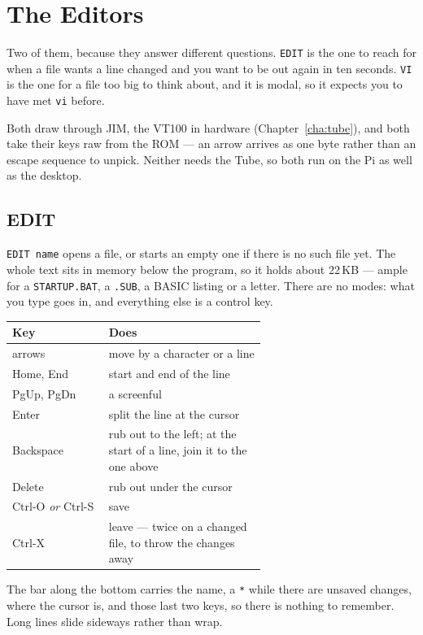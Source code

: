 \chapter{The Editors}\label{cha:editors}

Two of them, because they answer different questions. \verb|EDIT| is the
one to reach for when a file wants a line changed and you want to be out
again in ten seconds. \verb|VI| is the one for a file too big to think
about, and it is modal, so it expects you to have met \texttt{vi} before.

Both draw through JIM, the VT100 in hardware (Chapter~\ref{cha:tube}), and
both take their keys raw from the ROM --- an arrow arrives as one byte
rather than an escape sequence to unpick. Neither needs the Tube, so both
run on the Pi as well as the desktop.

\section{EDIT}
\verb|EDIT name| opens a file, or starts an empty one if there is no such
file yet. The whole text sits in memory below the program, so it holds
about 22\,KB --- ample for a \texttt{STARTUP.BAT}, a \texttt{.SUB}, a
BASIC listing or a letter. There are no modes: what you type goes in,
and everything else is a control key.

\begin{center}
\small
\begin{tabular}{@{}l >{\raggedright\arraybackslash}p{0.62\linewidth}@{}}
\toprule
\textbf{Key} & \textbf{Does} \\
\midrule
arrows & move by a character or a line \\
Home, End & start and end of the line \\
PgUp, PgDn & a screenful \\
Enter & split the line at the cursor \\
Backspace & rub out to the left; at the start of a line, join it to the one above \\
Delete & rub out under the cursor \\
Ctrl-O \emph{or} Ctrl-S & save \\
Ctrl-X & leave --- twice on a changed file, to throw the changes away \\
\bottomrule
\end{tabular}
\end{center}

The bar along the bottom carries the name, a \verb|*| while there are
unsaved changes, where the cursor is, and those last two keys, so there is
nothing to remember. Long lines slide sideways rather than wrap.

